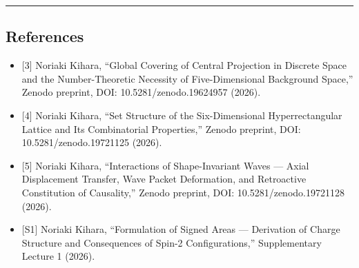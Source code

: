 \documentclass[
  a4paper,11pt]{article}
\providecommand{\tightlist}{%
  \setlength{\itemsep}{0pt}\setlength{\parskip}{0pt}}
\theoremstyle{definition}
\theoremstyle{remark}
\begin{document}
\begin{center}\rule{0.5\linewidth}{0.5pt}\end{center}

\subsection{References}\label{references}

\begin{itemize}
\tightlist
\item
  {[}3{]} Noriaki Kihara, ``Global Covering of Central Projection in
  Discrete Space and the Number-Theoretic Necessity of Five-Dimensional
  Background Space,'' Zenodo preprint, DOI: 10.5281/zenodo.19624957
  (2026).
\item
  {[}4{]} Noriaki Kihara, ``Set Structure of the Six-Dimensional
  Hyperrectangular Lattice and Its Combinatorial Properties,'' Zenodo
  preprint, DOI: 10.5281/zenodo.19721125 (2026).
\item
  {[}5{]} Noriaki Kihara, ``Interactions of Shape-Invariant Waves ---
  Axial Displacement Transfer, Wave Packet Deformation, and Retroactive
  Constitution of Causality,'' Zenodo preprint, DOI:
  10.5281/zenodo.19721128 (2026).
\item
  {[}S1{]} Noriaki Kihara, ``Formulation of Signed Areas --- Derivation
  of Charge Structure and Consequences of Spin-2 Configurations,''
  Supplementary Lecture 1 (2026).
\end{itemize}
\end{document}
